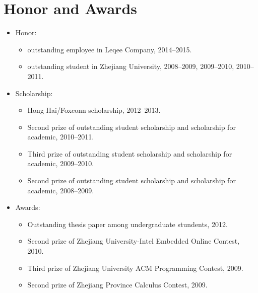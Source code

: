 \documentclass[letterpaper]{article}
\begin{document}
\section*{Honor and Awards}
\begin{itemize}
    \item Honor: 
        \begin{itemize}
            \item outstanding employee in Leqee Company, 2014--2015.
            \item outstanding student in Zhejiang University, 2008--2009, 2009--2010, 2010--2011.
        \end{itemize}
    \item Scholarship:
        \begin{itemize}
            \item Hong Hai/Foxconn scholarship, 2012--2013.	
            \item Second prize of outstanding student scholarship and scholarship for academic, 2010--2011.
            \item Third prize of outstanding student scholarship and scholarship for academic, 2009--2010.
            \item Second prize of outstanding student scholarship and scholarship for academic, 2008--2009.
        \end{itemize}
    \item Awards:
        \begin{itemize}
            \item Outstanding thesis paper among undergraduate stundents, 2012.
            \item Second prize of Zhejiang University-Intel Embedded Online Contest, 2010.
            \item Third prize of Zhejiang University ACM Programming Contest, 2009.
            \item Second prize of Zhejiang Province Calculus Contest, 2009.
        \end{itemize}
\end{itemize}

\end{document}
